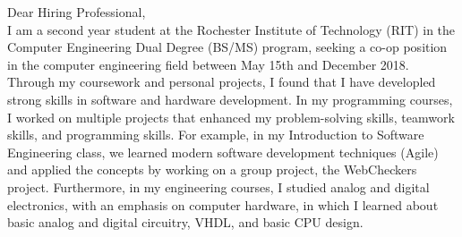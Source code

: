 \documentclass[line,margin]{res}
\begin{document}
\setlength\columnsep{-30pt}
\email{} %
\phone{} %
\address{} %
\address{} %
\website{} %

\begin{resume}
 \setlength
 \multicolsep{2pt}
 \begin{adjustwidth}{-92pt}{0pt}
 \vspace{10pt}

\noindent
Dear Hiring Professional, \\

\noindent
I am a second year student at the Rochester Institute of Technology (RIT) in the Computer Engineering Dual Degree (BS/MS) program, seeking a co-op position in the computer engineering field between May 15th and December 2018. \\

\noindent
Through my coursework and personal projects, I found that I have developled strong skills in software and hardware development. In my programming courses, I worked on multiple projects that enhanced my problem-solving skills, teamwork skills, and programming skills. For example, in my Introduction to Software Engineering class, we learned modern software development techniques (Agile) and applied the concepts by working on a group project, the WebCheckers project. Furthermore, in my engineering courses, I studied analog and digital electronics, with an emphasis on computer hardware, in which I learned about basic analog and digital circuitry, VHDL, and basic CPU design. \\


\end{adjustwidth}
\end{resume}
\end{document}
